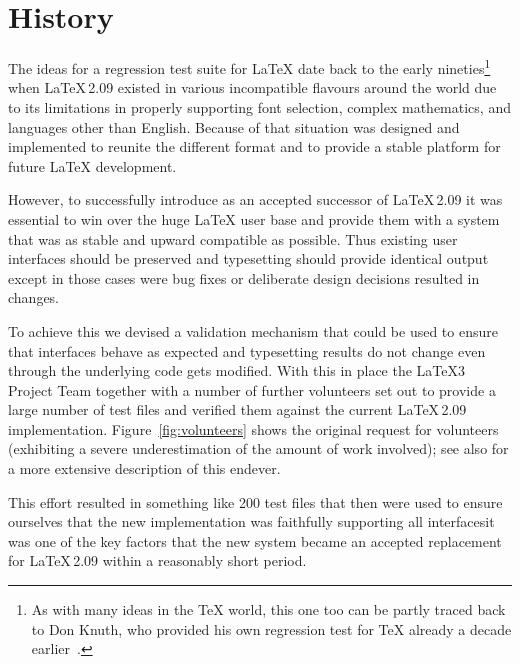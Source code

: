 \documentclass[a4paper]{ltugboat}
\begin{document}
\section{History}

The ideas for a regression test suite for \LaTeX{} date back to the
early nineties\footnote{As with many ideas in the \TeX{} world, this one too
  can be partly traced back to Don Knuth, who provided his own
  regression test for \TeX{} already a decade
  earlier~\cite{Knuth:1984:TTT}.} when \LaTeX\,2.09 existed in various
incompatible flavours around the world due to its limitations in
properly supporting font selection, complex mathematics, and languages
other than English.  Because of that situation \LaTeXe{} was designed
and implemented to reunite the different format and to provide a
stable platform for future \LaTeX{} development.

However, to successfully introduce \LaTeXe{} as an accepted successor
of \LaTeX\,2.09 it was essential to win over the huge \LaTeX{} user
base and provide them with a system that was as stable and upward
compatible as possible. Thus existing user interfaces should be
preserved and typesetting should provide identical output except in
those cases were bug fixes or deliberate design decisions resulted in
changes.

To achieve this
we
devised a validation mechanism that could be used
to ensure that interfaces behave as expected and typesetting results
do not change even through the underlying code gets modified. With
this in place the \LaTeX3 Project Team together with a number of
further volunteers set out to provide a large number of test files and
verified them against the current \LaTeX\,2.09
implementation. Figure~\ref{fig:volunteers} shows the original request
for volunteers (exhibiting a severe underestimation of the amount of
work involved); see also \cite{Mittelbach:TB18-4-309} for a more extensive
description of this endever. 

This effort resulted in something like 200 test files
that then were used to ensure ourselves that the new \LaTeXe{}
implementation was faithfully supporting all interfaces\Dash it was one
of the key factors that the new system became an accepted replacement
for \LaTeX\,2.09 within a reasonably short period.
\end{document}
